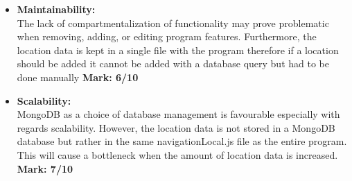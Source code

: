 \begin{itemize}
	
	\item \textbf{Maintainability:}\\The lack of compartmentalization of functionality may prove problematic when  removing, adding, or editing program features. Furthermore, the location data is kept in a single file with the program therefore if a location should be added it cannot be added with a database query but had to be done manually \textbf{Mark: 6/10}
	\item \textbf{Scalability:}\\MongoDB as a choice of database management is favourable especially with regards scalability. However, the location data is not stored in a MongoDB database but rather in the same navigationLocal.js file as the entire program. This will cause a bottleneck when the amount of location data is increased. \textbf{Mark: 7/10}
	
\end{itemize}